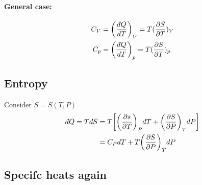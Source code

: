\documentclass[../main.tex]{subfiles}
\begin{document}
\paragraph{General case:}
\begin{align*}
    C_V &= \qt(\frac{\dbar Q}{dT})_V = T (\pdv{S}{T})_V \\
    C_p &= \qt(\frac{\dbar Q}{dT})_p = T (\pdv{S}{T})_p
\end{align*}

\subsection{Entropy}
Consider $S = S(T,P)$
\begin{align*}
    \dbar Q = T dS &= T\qt[
        \qt(\pdv{s}{T})_P dT + \qt(\pdv{S}{P})_T dP
    ] \\
    &= C_P dT + T \qt(\pdv{S}{P})_T dP
\end{align*}

\newpage
{}
\subsection{Specifc heats again}
\end{document}
